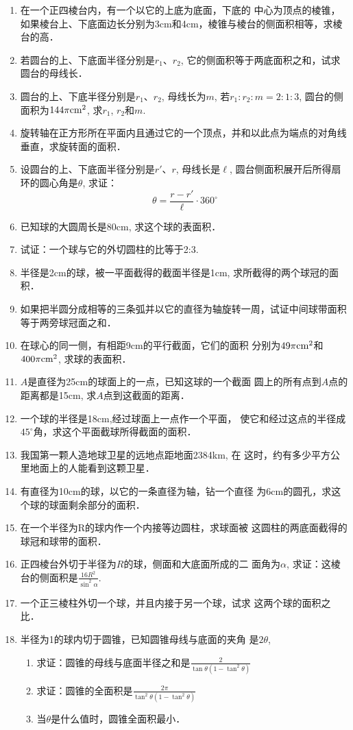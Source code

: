 \begin{enumerate}
\item 在一个正四棱台内，有一个以它的上底为底面，下底的
中心为顶点的棱锥，如果棱台上、下底面边长分别为3cm和4cm，棱锥与棱台的侧面积相等，求棱台的高．
\item 若圆台的上、下底面半径分别是$r_1$、$r_2$, 它的侧面积等于两底面积之和，试求圆台的母线长．
\item 圆台的上、下底半径分别是$r_1$、$r_2$, 母线长为$m$, 若$r_1:r_2:m=2:1:3$, 圆台的侧面积为$144\pi{\rm cm^2}$, 求$r_1$, $r_2$和$m$.
\item 旋转轴在正方形所在平面内且通过它的一个顶点，并和以此点为端点的对角线垂直，求旋转面的面积．
\item 设圆台的上、下底面半径分别是$r'$、$r$, 母线长是$\ell$, 圆台侧面积展开后所得扇环的圆心角是$\theta$, 求证：
\[\theta=\frac{r-r'}{\ell}\cdot 360^{\circ}\]
\item 已知球的大圆周长是80cm, 求这个球的表面积．
\item 试证：一个球与它的外切圆柱的比等于2:3. 
\item 半径是2cm的球，被一平面截得的截面半径是1cm, 求所截得的两个球冠的面积．
\item 如果把半圆分成相等的三条弧并以它的直径为轴旋转一周，试证中间球带面积等于两旁球冠面之和．
\item 在球心的同一侧，有相距9cm的平行截面，它们的面积
分别为$49\pi {\rm cm^2}$和$400\pi {\rm cm^2}$, 求球的表面积．
\item $A$是直径为25cm的球面上的一点，已知这球的一个截面
圆上的所有点到$A$点的距离都是15cm, 求$A$点到这截面的距离．
\item 一个球的半径是18cm,经过球面上一点作一个平面，
使它和经过这点的半径成$45^{\circ}$角，求这个平面截球所得截面的面积．
\item 我国第一颗人造地球卫星的远地点距地面2384km, 在
这时，约有多少平方公里地面上的人能看到这颗卫星．
\item 有直径为10cm的球，以它的一条直径为轴，钻一个直径
为6cm的圆孔，求这个球的球面剩余部分的面积．
\item 在一个半径为R的球内作一个内接等边圆柱，求球面被
这圆柱的两底面截得的球冠和球带的面积．
\item 正四棱台外切于半径为$R$的球，侧面和大底面所成的二
面角为$\alpha$, 求证：这棱台的侧面积是$\frac{16R^2}{\sin^2\alpha}$.
\item 一个正三棱柱外切一个球，并且内接于另一个球，试求
这两个球的面积之比．
\item 半径为1的球内切于圆锥，已知圆锥母线与底面的夹角
是$2\theta$,
\begin{enumerate}
\item 求证：圆锥的母线与底面半径之和是$\frac{2}{\tan\theta(1-\tan^2\theta)}$
\item 求证：圆锥的全面积是$\frac{2\pi}{\tan^2\theta(1-\tan^2\theta)}$
\item 当$\theta$是什么值时，圆锥全面积最小．
\end{enumerate}
\end{enumerate}

